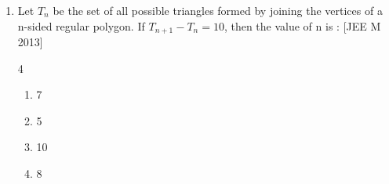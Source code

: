 \documentclass[journal,12pt,twocolumn]{IEEEtran}
\theoremstyle{remark}
\begin{document}
\begin{enumerate}
\begin{multicols}{4}
\begin{enumerate}
     \item 879
        \end{enumerate}
	\end{multicols}
\item Let $T_n$ be the set of all possible triangles formed by joining the vertices of a n-sided regular polygon. If $T_{n+1} - T_n = 10$, then the value of n is : \hfill[JEE M 2013]
	\begin{multicols}{4}
	\begin{enumerate}
     \item 7
     \item 5
     \item 10
     \item 8
        \end{enumerate}
	\end{multicols}
\end{enumerate}
 
\end{document}

